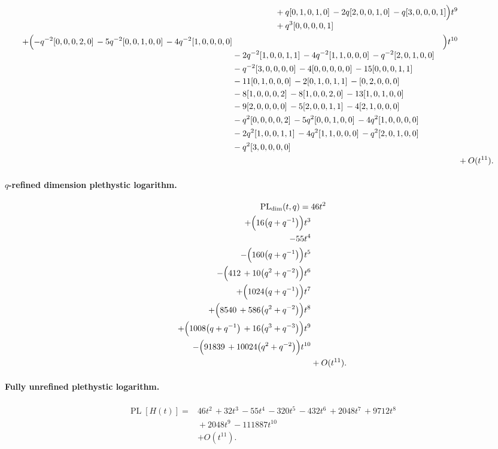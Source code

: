 \documentclass[10pt]{article}
\begin{document}
\[\begin{aligned}
\begin{aligned}[t]
  &{}+q[0,1,0,1,0]\,-2q[2,0,0,1,0]\,-q[3,0,0,0,1] \\
  &{}+q^{3}[0,0,0,0,1]\end{aligned}\Bigr)t^{9} \\
  + \Bigl(\begin{aligned}[t]-q^{-2}[0,0,0,2,0]\,-5q^{-2}[0,0,1,0,0]\,-4q^{-2}[1,0,0,0,0] \\
  &{}-2q^{-2}[1,0,0,1,1]\,-4q^{-2}[1,1,0,0,0]\,-q^{-2}[2,0,1,0,0] \\
  &{}-q^{-2}[3,0,0,0,0]\,-4[0,0,0,0,0]\,-15[0,0,0,1,1] \\
  &{}-11[0,1,0,0,0]\,-2[0,1,0,1,1]\,-[0,2,0,0,0] \\
  &{}-8[1,0,0,0,2]\,-8[1,0,0,2,0]\,-13[1,0,1,0,0] \\
  &{}-9[2,0,0,0,0]\,-5[2,0,0,1,1]\,-4[2,1,0,0,0] \\
  &{}-q^{2}[0,0,0,0,2]\,-5q^{2}[0,0,1,0,0]\,-4q^{2}[1,0,0,0,0] \\
  &{}-2q^{2}[1,0,0,1,1]\,-4q^{2}[1,1,0,0,0]\,-q^{2}[2,0,1,0,0] \\
  &{}-q^{2}[3,0,0,0,0]\end{aligned}\Bigr)t^{10} \\
  &+ O(t^{11}).
\end{aligned}
\]
\paragraph{$q$-refined dimension plethystic logarithm.}
\[
\begin{aligned}
\operatorname{PL}_{\mathrm{dim}}(t,q) ={}&
   46t^{2} \\
  + \Bigl(16\bigl(q+q^{-1}\bigr)\Bigr)t^{3} \\
  -55t^{4} \\
  -\Bigl(160\bigl(q+q^{-1}\bigr)\Bigr)t^{5} \\
  -\Bigl(412\,+10\bigl(q^{2}+q^{-2}\bigr)\Bigr)t^{6} \\
  + \Bigl(1024\bigl(q+q^{-1}\bigr)\Bigr)t^{7} \\
  + \Bigl(8540\,+586\bigl(q^{2}+q^{-2}\bigr)\Bigr)t^{8} \\
  + \Bigl(1008\bigl(q+q^{-1}\bigr)\,+16\bigl(q^{3}+q^{-3}\bigr)\Bigr)t^{9} \\
  -\Bigl(91839\,+10024\bigl(q^{2}+q^{-2}\bigr)\Bigr)t^{10} \\
  &+ O(t^{11}).
\end{aligned}
\]
\paragraph{Fully unrefined plethystic logarithm.}
\[
\begin{aligned}
\operatorname{PL}[H(t)] ={}& 46t^{2}\,+32t^{3}\,-55t^{4}\,-320t^{5}\,-432t^{6}\,+2048t^{7}\,+9712t^{8} \\
  &{}+2048t^{9}\,-111887t^{10} \\
  &+ O(t^{11}).
\end{aligned}
\]
\end{document}

